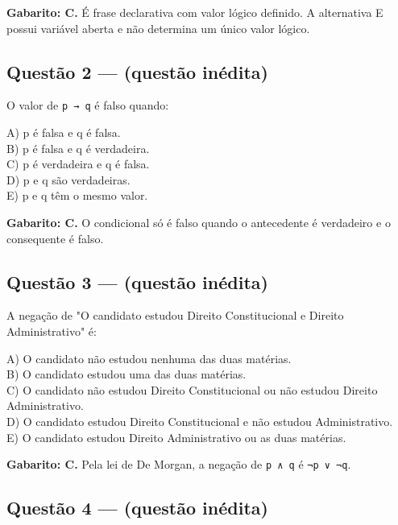 \documentclass[11pt,a4paper]{article}
\begin{document}
\begin{alerta}
\textbf{Gabarito: C.} É frase declarativa com valor lógico definido. A alternativa E possui variável aberta e não determina um único valor lógico.
\end{alerta}

\subsection*{Questão 2 — (questão inédita)}

O valor de \texttt{p → q} é falso quando:

A) p é falsa e q é falsa. \\ B) p é falsa e q é verdadeira. \\ C) p é verdadeira e q é falsa. \\ D) p e q são verdadeiras. \\ E) p e q têm o mesmo valor.

\begin{alerta}
\textbf{Gabarito: C.} O condicional só é falso quando o antecedente é verdadeiro e o consequente é falso.
\end{alerta}

\subsection*{Questão 3 — (questão inédita)}

A negação de "O candidato estudou Direito Constitucional e Direito Administrativo" é:

A) O candidato não estudou nenhuma das duas matérias. \\ B) O candidato estudou uma das duas matérias. \\ C) O candidato não estudou Direito Constitucional ou não estudou Direito Administrativo. \\ D) O candidato estudou Direito Constitucional e não estudou Administrativo. \\ E) O candidato estudou Direito Administrativo ou as duas matérias.

\begin{alerta}
\textbf{Gabarito: C.} Pela lei de De Morgan, a negação de \texttt{p ∧ q} é \texttt{¬p ∨ ¬q}.
\end{alerta}

\subsection*{Questão 4 — (questão inédita)}
\end{document}
